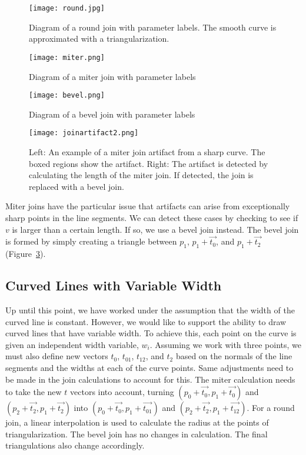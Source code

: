 \begin{figure}
\texttt{[image: round.jpg]}
\caption[Round Join Diagram]{Diagram of a round join with parameter labels. The smooth curve is approximated with a triangularization.}
\label{fig:roundjoin}
\end{figure}

\begin{figure}
\texttt{[image: miter.png]}
\caption[Miter Join Diagram]{Diagram of a miter join with parameter labels}
\label{fig:miterjoin}
\end{figure}

\begin{figure}
\texttt{[image: bevel.png]}
\caption[Bevel Join Diagram]{Diagram of a bevel join with parameter labels}
\label{fig:beveljoin}
\end{figure}



\begin{figure}
\texttt{[image: joinartifact2.png]}
\caption[Handling Miter artifacts]{Left: An example of a miter join artifact from a sharp curve. The boxed regions show the artifact. Right: The artifact is detected by calculating the length of the miter join. If detected, the join is replaced with a bevel join.}
\end{figure}

Miter joins have the particular issue that artifacts can arise from exceptionally sharp points in the line segments.
We can detect these cases by checking to see if $v$ is larger than a certain length.
If so, we use a bevel join instead.
The bevel join is formed by simply creating a triangle between $p_1$, $p_1 + \vec{t_0}$, and $p_1 + \vec{t_2}$ (Figure~\ref{fig:beveljoin}).

\subsection{Curved Lines with Variable Width}
Up until this point, we have worked under the assumption that the width of the curved line is constant.
However, we would like to support the ability to draw curved lines that have variable width.
To achieve this, each point on the curve is given an independent width variable, $w_i$.
Assuming we work with three points, we must also define new vectors $t_0$, $t_{01}$, $t_{12}$, and $t_2$ based on the normals of the line segments and the widths at each of the curve points.
Same adjustments need to be made in the join calculations to account for this. 
The miter calculation needs to take the new $t$ vectors into account, turning $(p_0 + \vec{t_0}, p_1 + \vec{t_0})$ and $(p_2 + \vec{t_2}, p_1 + \vec{t_2})$ into $(p_0 + \vec{t_0}, p_1 + \vec{t_{01}})$ and $(p_2 + \vec{t_2}, p_1 + \vec{t_{12}})$.
For a round join, a linear interpolation is used to calculate the radius at the points of triangularization.
The bevel join has no changes in calculation.
The final triangulations also change accordingly.

